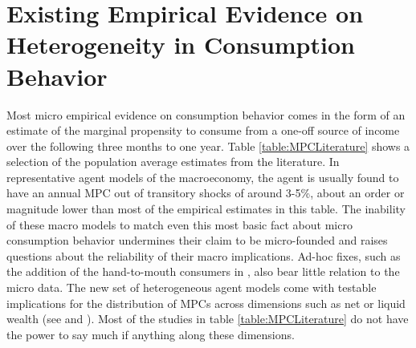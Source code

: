 \documentclass[titlepage]{\econtex}\newcommand{\texname}{ConsumptionHeterogeneity}
\begin{document}
\section{Existing Empirical Evidence on Heterogeneity in Consumption Behavior} \label{MPCEmpirics}
Most micro empirical evidence on consumption behavior comes in the form of an estimate of the marginal propensity to consume from a one-off source of income over the following three months to one year. Table \ref{table:MPCLiterature} shows a selection of the population average estimates from the literature. In representative agent models of the macroeconomy, the agent is usually found to have an annual MPC out of transitory shocks of around 3-5\%, about an order or magnitude lower than most of the empirical estimates in this table. The inability of these macro models to match even this most basic fact about micro consumption behavior undermines their claim to be micro-founded and raises questions about the reliability of their macro implications. Ad-hoc fixes, such as the addition of the hand-to-mouth consumers in \cite{campbell_consumption_1989}, also bear little relation to the micro data. The new set of heterogeneous agent models come with testable implications for the distribution of MPCs across dimensions such as net or liquid wealth (see \cite{carroll_distribution_2017} and \cite{violante_wealthy_2014}). Most of the studies in table \ref{table:MPCLiterature} do not have the power to say much if anything along these dimensions.
\end{document}
